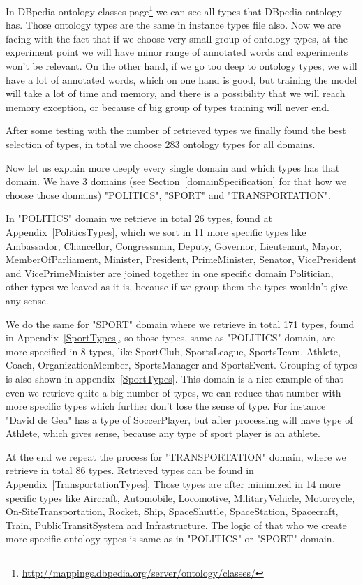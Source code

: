 \documentclass[thesis=M,english]{FITthesis}[2018/05/30]
\begin{document}
	In DBpedia ontology classes page\footnote{\url{http://mappings.dbpedia.org/server/ontology/classes/}} we can see all types that DBpedia ontology has. Those ontology types are the same in instance types file also. Now we are facing with the fact that if we choose very small group of ontology types, at the experiment point we will have minor range of annotated words and experiments won't be relevant. On the other hand, if we go too deep to ontology types, we will have a lot of annotated words, which on one hand is good, but training the model will take a lot of time and memory, and there is a possibility that we will reach memory exception, or because of big group of types training will never end.  

After some testing with the number of retrieved types we finally found the best selection of types, in total we choose 283 ontology types for all domains.

Now let us explain more deeply every single domain and which types has that domain. We have 3 domains (see Section~\ref{domainSpecification} for that how we choose those domains) "POLITICS", "SPORT" and "TRANSPORTATION".

In "POLITICS" domain we retrieve in total 26 types, found at Appendix~\ref{PoliticsTypes}, which we sort in 11 more specific types like Ambassador, Chancellor, Congressman, Deputy, Governor, Lieutenant, Mayor, MemberOfParliament, Minister, President, PrimeMinister, Senator, VicePresident and VicePrimeMinister are joined together in one specific domain Politician, other types we leaved as it is, because if we group them the types wouldn't give any sense.  

	We do the same for "SPORT" domain where we retrieve in total 171 types, found in Appendix~\ref{SportTypes}, so those types, same as "POLITICS" domain, are more specified in 8 types, like SportClub, SportsLeague, SportsTeam, Athlete, Coach, OrganizationMember, SportsManager and SportsEvent. Grouping of types is also shown in appendix~\ref{SportTypes}. This domain is a nice example of that even we retrieve quite a big number of types, we can reduce that number with more specific types which further don't lose the sense of type. For instance "David de Gea" has a type of SoccerPlayer, but after processing will have type of Athlete, which gives sense, because any type of sport player is an athlete.

	At the end we repeat the process for "TRANSPORTATION" domain, where we retrieve in total 86 types. Retrieved types can be found in Appendix~\ref{TransportationTypes}. Those types are after minimized in 14 more specific types like Aircraft, Automobile, Locomotive, MilitaryVehicle, Motorcycle, On-SiteTransportation, Rocket, Ship, SpaceShuttle, SpaceStation, Spacecraft, Train, PublicTransitSystem and Infrastructure. The logic of that who we create more specific ontology types is same as in "POLITICS" or "SPORT" domain.   
\end{document}
